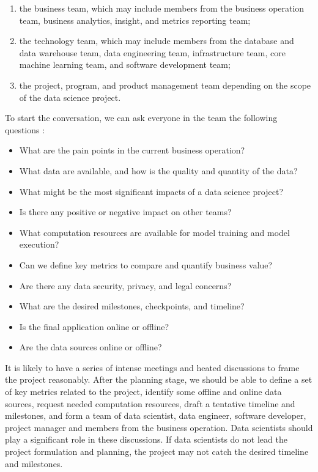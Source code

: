 \documentclass[12pt,]{krantz}
\providecommand{\tightlist}{%
  \setlength{\itemsep}{0pt}\setlength{\parskip}{0pt}}
\begin{document}
\begin{enumerate}
\def\labelenumi{(\arabic{enumi})}
\item
  the business team, which may include members from the business operation team, business analytics, insight, and metrics reporting team;
\item
  the technology team, which may include members from the database and data warehouse team, data engineering team, infrastructure team, core machine learning team, and software development team;
\item
  the project, program, and product management team depending on the scope of the data science project.
\end{enumerate}

To start the conversation, we can ask everyone in the team the following questions :

\begin{itemize}
\tightlist
\item
  What are the pain points in the current business operation?
\item
  What data are available, and how is the quality and quantity of the data?
\item
  What might be the most significant impacts of a data science project?
\item
  Is there any positive or negative impact on other teams?
\item
  What computation resources are available for model training and model execution?
\item
  Can we define key metrics to compare and quantify business value?
\item
  Are there any data security, privacy, and legal concerns?
\item
  What are the desired milestones, checkpoints, and timeline?
\item
  Is the final application online or offline?
\item
  Are the data sources online or offline?
\end{itemize}

It is likely to have a series of intense meetings and heated discussions to frame the project reasonably. After the planning stage, we should be able to define a set of key metrics related to the project, identify some offline and online data sources, request needed computation resources, draft a tentative timeline and milestones, and form a team of data scientist, data engineer, software developer, project manager and members from the business operation. Data scientists should play a significant role in these discussions. If data scientists do not lead the project formulation and planning, the project may not catch the desired timeline and milestones.
\end{document}
